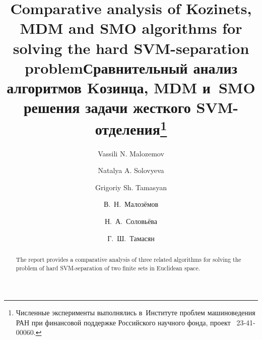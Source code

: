 \begin{englishtitle} %
\title{Comparative analysis of Kozinets, MDM and SMO algorithms for solving the hard SVM-separation problem}
\author{Vassili N. Malozemov \and Natalya A. Solovyeva  \and  Grigoriy Sh. Tamasyan
}

\maketitle

\begin{abstract}
The report provides a comparative analysis of three related algorithms for solving the problem of hard SVM-separation of two finite sets in Euclidean space.

\end{abstract}
\end{englishtitle}

\iffalse
\documentclass[12pt]{llncs}  


\usepackage{iftex}

\ifPDFTeX
\usepackage[T2A]{fontenc}
\usepackage[utf8]{inputenc} %
\usepackage[english,russian]{babel}
\fi

\usepackage{todonotes} 

\usepackage[russian]{nla}


\fi
%

\title{Сравнительный анализ алгоритмов Kозинца, MDM и~SMO решения задачи жесткого SVM-отделения\thanks{Численные эксперименты выполнялись в~Институте проблем машиноведения РАН при финансовой поддержке Российского научного фонда, проект \textnumero~23-41-00060.}}
\author{В.~Н.~Малозёмов  %
  \and  %
  Н.~А.~Соловьёва
  \and
  Г.~Ш.~Тамасян
} %

